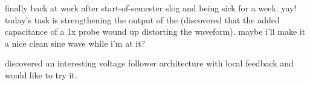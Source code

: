 finally back at work after start-of-semester slog and being sick for a week.
yay! today's task is strengthening the output of the \pll (discovered that the
added capacitance of a 1x probe wound up distorting the waveform). maybe i'll
make it a nice clean sine wave while i'm at it?

discovered an interesting voltage follower architecture with local feedback
\autocite{flipped-follower} and would like to try it.

